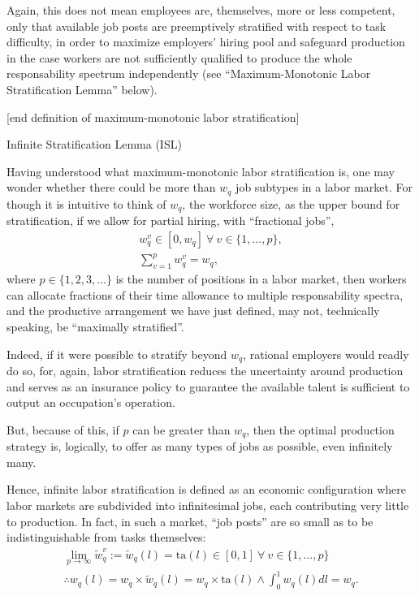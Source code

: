 \documentclass[hidelinks, nonatbib]{elsarticle}
\begin{document}
\begin{enumerate}
Again, this does not mean employees are, themselves, more or less competent, only that available job posts are preemptively stratified with respect to task difficulty, in order to maximize employers' hiring pool and safeguard production in the case workers are not sufficiently qualified to produce the whole responsability spectrum independently (see ``Maximum-Monotonic Labor Stratification Lemma'' below).

[end definition of maximum-monotonic labor stratification]

Infinite Stratification Lemma (ISL)

Having understood what maximum-monotonic labor stratification is, one may wonder whether there could be more than $w_q$ job subtypes in a labor market. For though it is intuitive to think of $w_q$, the workforce size, as the upper bound for stratification, if we allow for partial hiring, with ``fractional jobs'',
\begin{gather}
    w_{q}^{v} 
    \in 
    [0, w_q]
    \
    \forall
    \
    v \in \{1, \dots, p\}
    ,
    \\
    \sum_{v=1}^{p}
    w_{q}^{v}
    =
    w_q
    ,
\end{gather}
where $p \in \{1, 2, 3, \dots\}$ is the number of positions in a labor market, then workers can allocate fractions of their time allowance to multiple responsability spectra, and the productive arrangement we have just defined, may not, technically speaking, be ``maximally stratified''. 

Indeed, if it were possible to stratify beyond $w_q$, rational employers would readly do so, for, again, labor stratification reduces the uncertainty around production and serves as an insurance policy to guarantee the available talent is sufficient to output an occupation's operation.

But, because of this, if $p$ can be greater than $w_q$, then the optimal production strategy is, logically, to offer as many types of jobs as possible, even infinitely many.

Hence, infinite labor stratification is defined as an economic configuration where labor markets are subdivided into infinitesimal jobs, each contributing very little to production. In fact, in such a market, ``job posts'' are so small as to be indistinguishable from tasks themselves:
\begin{gather}
    \lim_{p \rightarrow \infty}{
        \tilde{w}_{q}^{v}
    }
    := 
    \tilde{w}_{q}(l)
    =
    \text{ta}(l)
    \in [0,1]
    \
    \forall
    \
    v \in \{1, \dots, p\}
    \\
    \therefore
    w_{q}(l)
    = 
    w_q \times \tilde{w}_{q}(l)
    =
    w_q \times \text{ta}(l)
    \land
    \int_{0}^{1}{
        w_{q}(l)
        dl
    }
    =
    w_q
    .
\end{gather}


\end{enumerate}
\end{document}
